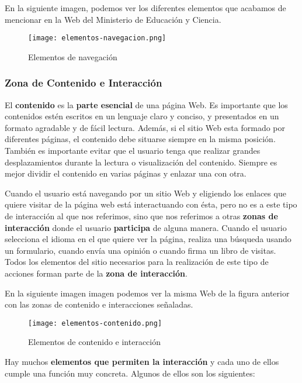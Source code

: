 En la siguiente imagen, podemos ver los diferentes elementos que acabamos de mencionar en la Web del Ministerio de Educación y Ciencia.

\begin{figure}[H]
    \centering
    \texttt{[image: elementos-navegacion.png]}
    \caption{Elementos de navegación}
\end{figure}

\subsubsection{Zona de Contenido e Interacción}
El \textbf{contenido} es la \textbf{parte esencial} de una página Web. Es importante que los contenidos estén escritos en un lenguaje claro y conciso, y presentados en un formato agradable y de fácil lectura. Además, si el sitio Web esta formado por diferentes páginas, el contenido debe situarse siempre en la misma posición. También es importante evitar que el usuario tenga que realizar grandes desplazamientos durante la lectura o visualización del contenido. Siempre es mejor dividir el contenido en varias páginas y enlazar una con otra.

Cuando el usuario está navegando por un sitio Web y eligiendo los enlaces que quiere visitar de la página web está interactuando con ésta, pero no es a este tipo de interacción al que nos referimos, sino que nos referimos a otras \textbf{zonas de interacción} donde el usuario \textbf{participa} de alguna manera. Cuando el usuario selecciona el idioma en el que quiere ver la página, realiza una búsqueda usando un formulario, cuando envía una opinión o cuando firma un libro de visitas. Todos los elementos del sitio necesarios para la realización de este tipo de acciones forman parte de la \textbf{zona de interacción}.

En la siguiente imagen imagen podemos ver la misma Web de la figura anterior con las zonas de contenido e interacciones señaladas.

\begin{figure}[H]
    \centering
    \texttt{[image: elementos-contenido.png]}
    \caption{Elementos de contenido e interacción}
\end{figure}

Hay muchos \textbf{elementos que permiten la interacción} y cada uno de ellos cumple una función muy concreta. Algunos de ellos son los siguientes:

